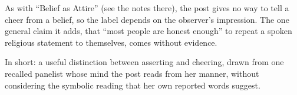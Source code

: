 \begin{afterword}
As with ``Belief as Attire'' (see the notes there), the post gives no way to tell a cheer from a belief, so the label depends on the observer's impression. The one general claim it adds, that ``most people are honest enough'' to repeat a spoken religious statement to themselves, comes without evidence.

In short: a useful distinction between asserting and cheering, drawn from one recalled panelist whose mind the post reads from her manner, without considering the symbolic reading that her own reported words suggest.
\end{afterword}
